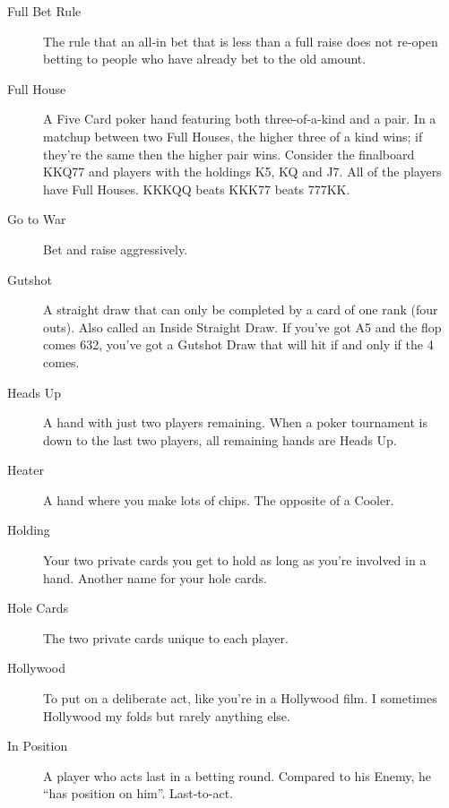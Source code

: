 \begin{description}

\item[Full Bet Rule] The rule that an all-in bet that is less than a
full raise does not re-open betting to people who have already bet to
the old amount.

\item[Full House] A Five Card poker hand featuring both
three-of-a-kind and a pair. In a matchup between two Full Houses, the
higher three of a kind wins; if they're the same then the higher pair
wins. Consider the finalboard KKQ77 and players with the holdings K5,
KQ and J7. All of the players have Full Houses. KKKQQ beats KKK77
beats 777KK.

\item[Go to War] Bet and raise aggressively.

\item[Gutshot] A straight draw that can only be completed by a card of
one rank (four outs). Also called an Inside Straight Draw. If you've
got A5 and the flop comes 632, you've got a Gutshot Draw that will hit
if and only if the 4 comes.

\item[Heads Up] A hand with just two players remaining. When a poker
tournament is down to the last two players, all remaining hands are
Heads Up.

\item[Heater] A hand where you make lots of chips. The opposite of a
Cooler.

\item[Holding] Your two private cards you get to hold as long as
you're involved in a hand. Another name for your hole cards.

\item[Hole Cards] The two private cards unique to each player.

\item[Hollywood] To put on a deliberate act, like you're in a
Hollywood film. I sometimes Hollywood my folds but rarely anything
else.

\item[In Position] A player who acts last in a betting round. Compared
to his Enemy, he ``has position on him''. Last-to-act.


\end{description}
